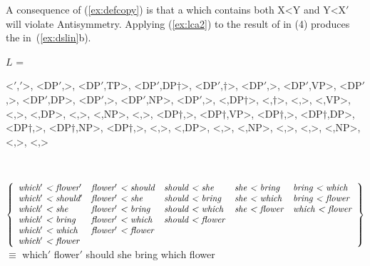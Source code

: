 \documentclass[output=paper]{langsci/langscibook}
\begin{document}
A consequence of (\ref{ex:defcopy}) is that a  which contains both
X<Y and Y<X$'$ will violate Antisymmetry. Applying (\ref{ex:lca2}) to the
result of  in (4) produces the  in~(\ref{ex:dslin}b).
\begin{exe}
	\ex \label{ex:dslin}
	\begin{xlist}
		\small
	\ex $L$ = \parbox[t]{4in}{<$'$,$'$>, <DP$'$,>, <DP$'$,TP>, <DP$'$,DP$\dag$>, <DP$'$,$\dag$>, <DP$'$,>, <DP$'$,VP>, <DP$'$,>, <DP$'$,DP>, <DP$'$,>, <DP$'$,NP>, <DP$'$,>, <,DP$\dag$>, <,$\dag$>, <,>, <,VP>, <,>, <,DP>, <,>, <,NP>, <,>, <DP$\dag$,>, <DP$\dag$,VP>, <DP$\dag$,>, <DP$\dag$,DP>, <DP$\dag$,>, <DP$\dag$,NP>, <DP$\dag$,>, <,>, <,DP>, <,>, <,NP>, <,>, <,>, <,NP>, <,>, <,>}

	\ex \
	\linebreak

	\hspace*{-20pt}
	\footnotesize
	$\left\{
		\begin{array}{llllll}
            \text{\emph{which$'$ < flower$'$}} & \text{\emph{flower$'$ < should}} & \text{\emph{should < she}}      & \text{\emph{she < bring}}  & \text{\emph{bring < which}}\\%
            \text{\emph{which$'$ < should$'$}} & \text{\emph{flower$'$ < she}} & \text{\emph{should < bring}}    & \text{\emph{she < which}}  & \text{\emph{bring < flower}}\\
            \text{\emph{which$'$ < she}}     & \text{\emph{flower$'$ < bring}} & \text{\emph{should < which}}    & \text{\emph{she < flower}} & \text{\emph{which < flower}}\\
            \text{\emph{which$'$ < bring}}   & \text{\emph{flower$'$ < which}}     & \text{\emph{should < flower}}\\
            \text{\emph{which$'$ < which}}   & \text{\emph{flower$'$ < flower}} \\
            \text{\emph{which$'$ < flower}}
    \end{array}
    \right\}$\\[5pt] \normalsize
	$\equiv$ which$'$ flower$'$ should she bring which flower
	\end{xlist}
\end{exe}
\end{document}
